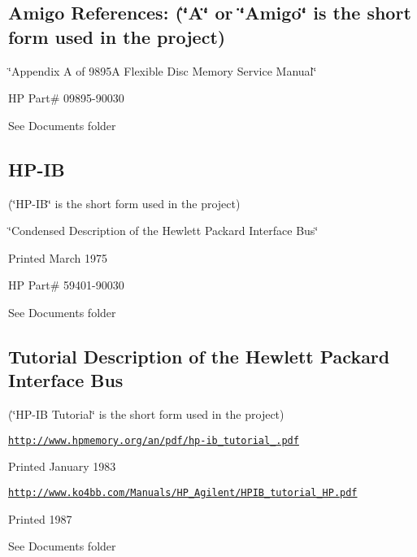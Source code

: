 {\bfseries \subsection*{Amigo References\+: (\char`\"{}\+A\char`\"{} or \char`\"{}\+Amigo\char`\"{} is the short form used in the project)}}

{\bfseries 
\begin{DoxyItemize}
\item \char`\"{}\+Appendix A of 9895\+A Flexible Disc Memory Service Manual\char`\"{}
\item HP Part\# 09895-\/90030
\item See Documents folder
\end{DoxyItemize}}

{\bfseries \subsection*{H\+P-\/\+IB}}

{\bfseries 
\begin{DoxyItemize}
\item (\char`\"{}\+H\+P-\/\+I\+B\char`\"{} is the short form used in the project)
\item \char`\"{}\+Condensed Description of the Hewlett Packard Interface Bus\char`\"{}
\item Printed March 1975
\item HP Part\# 59401-\/90030
\item See Documents folder
\end{DoxyItemize}}

{\bfseries \subsection*{Tutorial Description of the Hewlett Packard Interface Bus}}

{\bfseries 
\begin{DoxyItemize}
\item (\char`\"{}\+H\+P-\/\+I\+B Tutorial\char`\"{} is the short form used in the project)
\item \href{http://www.hpmemory.org/an/pdf/hp-ib_tutorial_1980.pdf}{\tt http\+://www.\+hpmemory.\+org/an/pdf/hp-\/ib\+\_\+tutorial\+\_.\+pdf}
\item Printed January 1983
\item \href{http://www.ko4bb.com/Manuals/HP_Agilent/HPIB_tutorial_HP.pdf}{\tt http\+://www.\+ko4bb.\+com/\+Manuals/\+H\+P\+\_\+\+Agilent/\+H\+P\+I\+B\+\_\+tutorial\+\_\+\+H\+P.\+pdf}
\item Printed 1987
\item See Documents folder
\end{DoxyItemize}}

